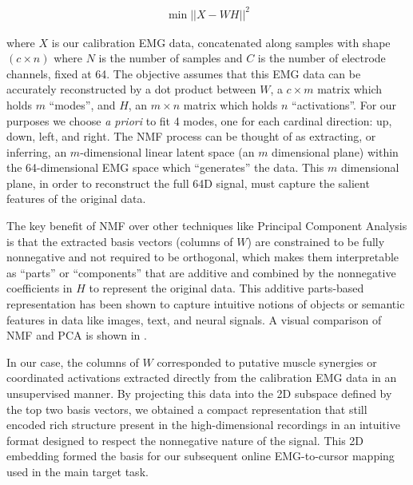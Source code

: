 \documentclass[../main.tex]{subfiles}
\begin{document}
\begin{align}
  \min{||X - WH||^{2}}
\end{align}

where $X$ is our calibration EMG data, concatenated along samples with shape $(c\times{n})$ where $N$ is the number of samples and $C$ is the number of electrode channels, fixed at 64. The objective assumes that this EMG data can be accurately reconstructed by a dot product between $W$, a $c\times{m}$ matrix which holds $m$ ``modes'', and $H$, an $m\times{n}$ matrix which holds $n$ ``activations''. For our purposes we choose \textit{a priori} to fit 4 modes, one for each cardinal direction: up, down, left, and right. The NMF process can be thought of as extracting, or inferring, an $m$-dimensional linear latent space (an $m$ dimensional plane) within the 64-dimensional EMG space which ``generates'' the data. This $m$ dimensional plane, in order to reconstruct the full 64D signal, must capture the salient features of the original data.

The key benefit of NMF over other techniques like Principal Component Analysis is that the extracted basis vectors (columns of $W$) are constrained to be fully nonnegative and not required to be orthogonal, which makes them interpretable as ``parts'' or ``components'' that are additive and combined by the nonnegative coefficients in $H$ to represent the original data. This additive parts-based representation has been shown to capture intuitive notions of objects or semantic features in data like images, text, and neural signals\cite{leeLearningPartsObjects1999a,eggertSparseCodingNMF2004}. A visual comparison of NMF and PCA is shown in .

In our case, the columns of $W$ corresponded to putative muscle synergies or coordinated activations extracted directly from the calibration EMG data in an unsupervised manner. By projecting this data into the 2D subspace defined by the top two basis vectors, we obtained a compact representation that still encoded rich structure present in the high-dimensional recordings in an intuitive format designed to respect the nonnegative nature of the signal. This 2D embedding formed the basis for our subsequent online EMG-to-cursor mapping used in the main target task.
\end{document}
